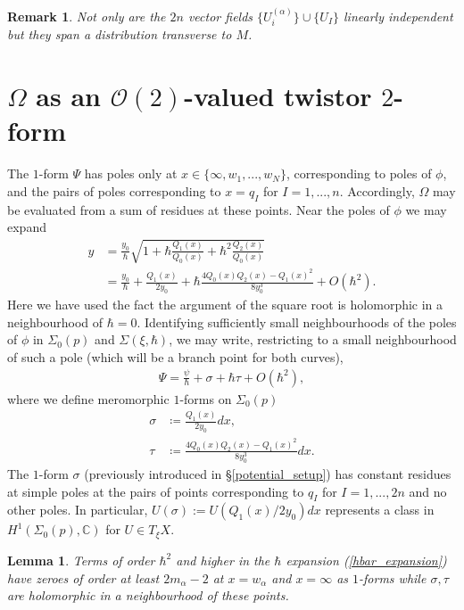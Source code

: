 \documentclass[a4paper,12pt,reqno]{amsart}
\newcounter{counter2}
\numberwithin{equation}{section}
\numberwithin{counter2}{section}
\newcounter{counter3}
\newtheorem{lemma}[counter2]{Lemma}
\newtheorem{rem}[counter2]{Remark}
\begin{document}
\begin{rem}
Not only are the $2n$ vector fields $\{U_{i}^{(\alpha)}\} \cup \{U_I\}$ linearly independent but they span a distribution transverse to $M$.  
\end{rem}

\section{$\Omega$ as an $\mathcal{O}(2)$-valued twistor $2$-form}\label{Omega_is_O2}
The $1$-form $\Psi$ has poles only at $x \in \{\infty, w_1,...,w_N\}$,  corresponding to poles of $\phi$,  and the pairs of poles corresponding to $x = q_I$ for $I = 1,...,n$.  Accordingly,  $\Omega$ may be evaluated from a sum of residues at these points.  
Near the poles of $\phi$ we may expand
\begin{align}
y &= \frac{y_0}{\hbar}\sqrt{1 + \hbar\frac{Q_1(x)}{Q_0(x)} + \hbar^2\frac{Q_2(x)}{Q_0(x)}} \nonumber \\ 
&= \frac{y_0}{\hbar} + \frac{Q_1(x)}{2y_0} + \hbar\frac{4Q_0(x)Q_2(x)-Q_1(x)^2}{8y_0^3} + O(\hbar^2). 
\end{align}
Here we have used the fact the argument of the square root is holomorphic in a neighbourhood of $\hbar = 0$.  Identifying sufficiently small neighbourhoods of the poles of $\phi$ in $\Sigma_0(p)$ and $\Sigma(\xi,\hbar)$,  we may write,  restricting to a small neighbourhood of such a pole (which will be a branch point for both curves), 
\begin{align}\label{hbar_expansion}
\Psi = \frac{\psi}{\hbar} + \sigma + \hbar\tau + O(\hbar^2),  
\end{align}
where we define meromorphic $1$-forms on $\Sigma_0(p)$
\begin{align}
\sigma &\coloneqq \frac{Q_1(x)}{2y_0} dx,  %
\\ 
\tau &\coloneqq \frac{4Q_0(x)Q_2(x)-Q_1(x)^2}{8y_0^3}dx. 
\end{align}
The $1$-form $\sigma$ (previously introduced in \S \ref{potential_setup}) has constant residues at simple poles at the pairs of points corresponding to $q_I$ for $I = 1,...,2n$ and no other poles.  In particular,   $U(\sigma) := U(Q_1(x)/2y_0) dx$ represents a class in $H^1(\Sigma_0(p),\mathbb{C})$ for $U \in T_\xi X$.  
 \begin{lemma}\label{hbar3_does_not_contribute}
 Terms of order $\hbar^2$ and higher in the $\hbar$ expansion \textup{(\ref{hbar_expansion})} have zeroes of order at least $2m_\alpha-2$ at $x = w_\alpha$ and $x = \infty$ as $1$-forms while $\sigma,\tau$ are holomorphic in a neighbourhood of these points.  
 \end{lemma}
\end{document}
